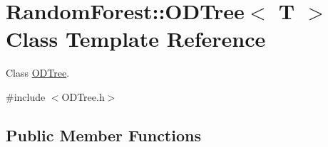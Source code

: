 \hypertarget{class_random_forest_1_1_o_d_tree}{}\section{Random\+Forest\+:\+:O\+D\+Tree$<$ T $>$ Class Template Reference}
\label{class_random_forest_1_1_o_d_tree}


Class \hyperlink{class_random_forest_1_1_o_d_tree}{O\+D\+Tree}.  




{\ttfamily \#include $<$O\+D\+Tree.\+h$>$}

\subsection*{Public Member Functions}

